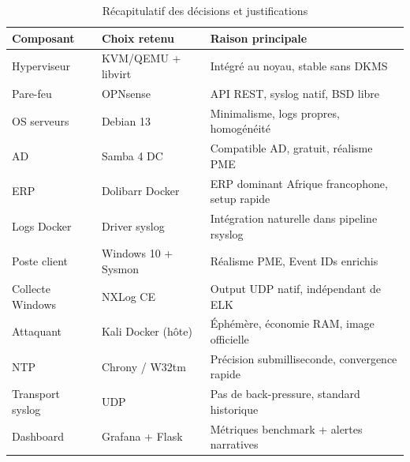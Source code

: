 \documentclass[12pt,a4paper]{article}
\begin{document}
\begin{table}[H]
\centering
\caption{Récapitulatif des décisions et justifications}
\label{tab:decisions}
\begin{tabularx}{\textwidth}{|l|X|X|}
\hline
\textbf{Composant} & \textbf{Choix retenu} & \textbf{Raison principale} \\
\hline
Hyperviseur      & KVM/QEMU + libvirt    & Intégré au noyau, stable sans DKMS \\
Pare-feu         & OPNsense              & API REST, syslog natif, BSD libre \\
OS serveurs      & Debian 13            & Minimalisme, logs propres, homogénéité \\
AD               & Samba 4 DC            & Compatible AD, gratuit, réalisme PME \\
ERP              & Dolibarr Docker       & ERP dominant Afrique francophone, setup rapide \\
Logs Docker      & Driver syslog         & Intégration naturelle dans pipeline rsyslog \\
Poste client     & Windows 10 + Sysmon   & Réalisme PME, Event IDs enrichis \\
Collecte Windows & NXLog CE              & Output UDP natif, indépendant de ELK \\
Attaquant        & Kali Docker (hôte)    & Éphémère, économie RAM, image officielle \\
NTP              & Chrony / W32tm        & Précision submilliseconde, convergence rapide \\
Transport syslog & UDP                   & Pas de back-pressure, standard historique \\
Dashboard        & Grafana + Flask       & Métriques benchmark + alertes narratives \\
\hline
\end{tabularx}
\end{table}
\newpage
\end{document}
